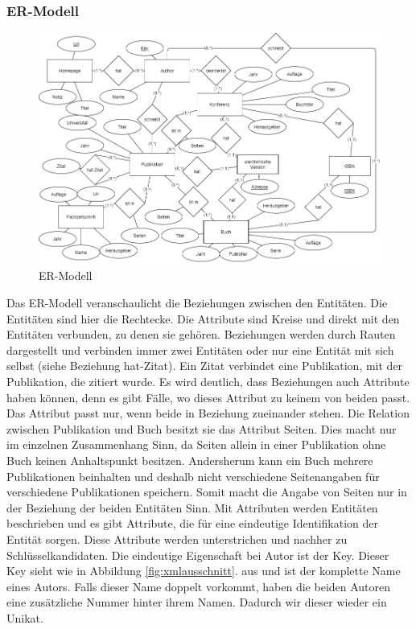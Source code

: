 \subsubsection{ER-Modell}
\begin{figure}[!htb]
	\centering
	\includegraphics[width=15cm,keepaspectratio]{bilder/ER-Modell}
	\caption{ER-Modell}
	\label{fig:er-modell}
\end{figure}


Das ER-Modell veranschaulicht die Beziehungen zwischen den Entitäten. Die Entitäten
sind hier die Rechtecke. Die Attribute sind Kreise und direkt mit den Entitäten verbunden, zu denen sie gehören. Beziehungen werden durch Rauten dargestellt und verbinden immer zwei Entitäten oder nur eine Entität mit sich selbst (siehe Beziehung hat-Zitat).
Ein Zitat verbindet eine Publikation, mit der Publikation, die zitiert wurde. Es wird deutlich, dass Beziehungen auch Attribute haben können, denn es gibt Fälle, wo dieses Attribut zu keinem von beiden passt. Das Attribut passt nur, wenn beide in Beziehung zueinander stehen. 
Die Relation zwischen Publikation und Buch besitzt sie das Attribut Seiten. Dies macht nur im einzelnen Zusammenhang Sinn, da Seiten allein in einer Publikation ohne Buch keinen Anhaltspunkt besitzen. Andersherum kann ein Buch mehrere Publikationen beinhalten und deshalb nicht verschiedene Seitenangaben für verschiedene Publikationen speichern. Somit macht die Angabe von Seiten nur in der Beziehung der beiden Entitäten Sinn. Mit Attributen werden Entitäten beschrieben und es gibt Attribute, die für eine eindeutige Identifikation der Entität sorgen. Diese Attribute
werden unterstrichen und nachher zu Schlüsselkandidaten. Die eindeutige Eigenschaft
bei Autor ist der Key. Dieser Key sieht wie in Abbildung \ref{fig:xmlausschnitt}. aus und ist der komplette Name eines Autors. Falls dieser Name doppelt vorkommt, haben die beiden Autoren eine zusätzliche Nummer hinter ihrem Namen. Dadurch wir dieser wieder ein Unikat.

